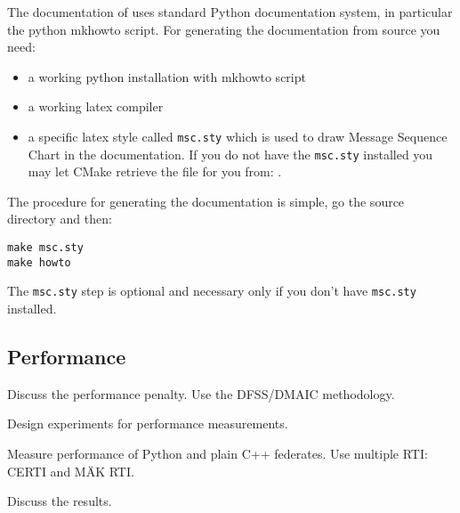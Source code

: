 \documentclass[12pt,a4paper]{howto}
\begin{document}
The documentation of  uses standard Python documentation
system, in particular the python mkhowto script.
For generating the documentation from source you need:
\begin{itemize}
  \item a working python installation with mkhowto script
  \item a working latex compiler
  \item a specific latex style called \texttt{msc.sty} which is used
        to draw Message Sequence Chart in the documentation.
        If you do not have the \texttt{msc.sty} installed you may
        let CMake retrieve the file for you from:        
        .
\end{itemize}

The procedure for generating the documentation is simple,
go the  source directory and then:
\begin{verbatim}
make msc.sty
make howto
\end{verbatim}

The \texttt{msc.sty} step is optional and necessary only if you don't have
\texttt{msc.sty} installed.

\subsection{Performance}

Discuss the performance penalty. Use the DFSS/DMAIC methodology.

Design experiments for performance measurements.

Measure performance of Python and plain C++ federates. Use multiple RTI: CERTI and MÄK RTI.

Discuss the results.





\end{document}
